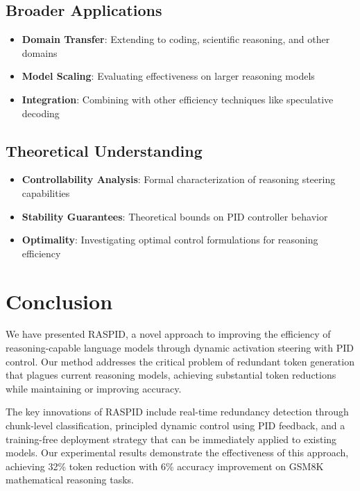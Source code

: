 \documentclass{article}
\begin{document}
\subsection{Broader Applications}

\begin{itemize}
\item \textbf{Domain Transfer}: Extending to coding, scientific reasoning, and other domains
\item \textbf{Model Scaling}: Evaluating effectiveness on larger reasoning models
\item \textbf{Integration}: Combining with other efficiency techniques like speculative decoding
\end{itemize}

\subsection{Theoretical Understanding}

\begin{itemize}
\item \textbf{Controllability Analysis}: Formal characterization of reasoning steering capabilities
\item \textbf{Stability Guarantees}: Theoretical bounds on PID controller behavior
\item \textbf{Optimality}: Investigating optimal control formulations for reasoning efficiency
\end{itemize}

\section{Conclusion}

We have presented RASPID, a novel approach to improving the efficiency of reasoning-capable language models through dynamic activation steering with PID control. Our method addresses the critical problem of redundant token generation that plagues current reasoning models, achieving substantial token reductions while maintaining or improving accuracy.

The key innovations of RASPID include real-time redundancy detection through chunk-level classification, principled dynamic control using PID feedback, and a training-free deployment strategy that can be immediately applied to existing models. Our experimental results demonstrate the effectiveness of this approach, achieving 32\% token reduction with 6\% accuracy improvement on GSM8K mathematical reasoning tasks.
\end{document}
